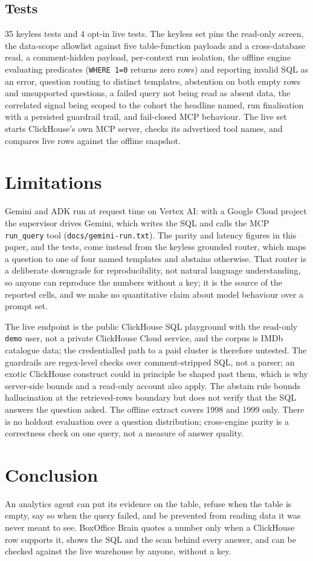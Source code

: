\documentclass[10pt,twocolumn]{article}
\begin{document}
\subsection{Tests}
35 keyless tests and 4 opt-in live tests. The keyless set pins the read-only
screen, the data-scope allowlist against five table-function payloads and a
cross-database read, a comment-hidden payload, per-context run isolation, the
offline engine evaluating predicates (\texttt{WHERE 1=0} returns zero rows) and
reporting invalid SQL as an error, question routing to distinct templates,
abstention on both empty rows and unsupported questions, a failed query not being
read as absent data, the correlated signal being scoped to the cohort the
headline named, run finalisation with a persisted guardrail trail, and
fail-closed MCP behaviour. The live set starts ClickHouse's own MCP server,
checks its advertised tool names, and compares live rows against the offline
snapshot.

\section{Limitations}
Gemini and ADK run at request time on Vertex AI: with a Google Cloud project the
supervisor drives Gemini, which writes the SQL and calls the MCP \texttt{run\_query}
tool (\texttt{docs/gemini-run.txt}). The parity and latency figures in this paper,
and the tests, come instead from the keyless grounded router, which maps a
question to one of four named templates and abstains otherwise. That router is a
deliberate downgrade for reproducibility, not natural language understanding, so
anyone can reproduce the numbers without a key; it is the source of the
reported cells, and we make no quantitative claim about model behaviour over a
prompt set.

The live endpoint is the public ClickHouse SQL playground with the read-only
\texttt{demo} user, not a private ClickHouse Cloud service, and the corpus is
IMDb catalogue data; the credentialled path to a paid cluster is therefore
untested. The guardrails are regex-level checks over comment-stripped SQL, not a
parser; an exotic ClickHouse construct could in principle be shaped past them,
which is why server-side bounds and a read-only account also apply. The abstain
rule bounds hallucination at the retrieved-rows boundary but does not verify that
the SQL answers the question asked. The offline extract covers 1998 and 1999
only. There is no holdout evaluation over a question distribution; cross-engine
parity is a correctness check on one query, not a measure of answer quality.

\section{Conclusion}
An analytics agent can put its evidence on the table, refuse when the table is
empty, say so when the query failed, and be prevented from reading data it was
never meant to see. BoxOffice Brain quotes a number only when a ClickHouse row
supports it, shows the SQL and the scan behind every answer, and can be checked
against the live warehouse by anyone, without a key.
\end{document}

